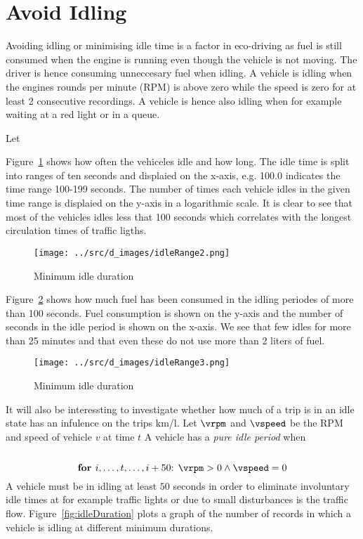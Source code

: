 \section{Avoid Idling}

Avoiding idling or minimising idle time is a factor in eco-driving as fuel is still consumed when the engine is running even though the vehicle is not moving.
The driver is hence consuming unneccesary fuel when idling.
A vehicle is idling when the engines rounds per minute (RPM) is above zero while the speed is zero for at least 2 consecutive recordings.
A vehicle is hence also idling when for example waiting at a red light or in a queue. 

Let 


Figure~\ref{fig:idleRange2} shows how often the vehiceles idle and how long.
The idle time is split into ranges of ten seconds and displaied on the x-axis, e.g. 100.0 indicates the time range 100-199 seconds. 
The number of times each vehicle idles in the given time range is displaied on the y-axis in a logarithmic scale. 
It is clear to see that most of the vehicles idles less that 100 seconds which correlates with the longest circulation times of traffic ligths. 
\begin{figure}[htb]
\centering
\texttt{[image: ../src/d\_images/idleRange2.png]}
\caption{Minimum idle duration}
\label{fig:idleRange2}
\end{figure}

Figure~\ref{fig:idleRange3} shows how much fuel has been consumed in the idling periodes of more than 100 seconds. 
Fuel consumption is shown on the y-axis and the number of seconds in the idle period is shown on the x-axis.
We see that few idles for more than 25 minutes and that even these do not use more than 2 liters of fuel.
\begin{figure}[htb]
\centering
\texttt{[image: ../src/d\_images/idleRange3.png]}
\caption{Minimum idle duration}
\label{fig:idleRange3}
\end{figure}

It will also be interessting to investigate whether how much of a trip is in an idle state has an infulence on the trips km/l.
Let $\vrpm$ and $\vspeed$ be the RPM and speed of vehicle $v$ at time $t$
A vehicle has a \textit{pure idle period} when


\[\]


\[\mbox{\textbf{for }} i, \dots ,t, \dots, i+50 \mbox{: }\vrpm> 0 \wedge \vspeed=0 \]
A vehicle must be in idling at least $50$ seconds in order to eliminate involuntary idle times at for example traffic lights or due to small disturbances is the traffic flow.
Figure~\ref{fig:idleDuration} plots a graph of the number of records in which a vehicle is idling at different minimum durations. 

